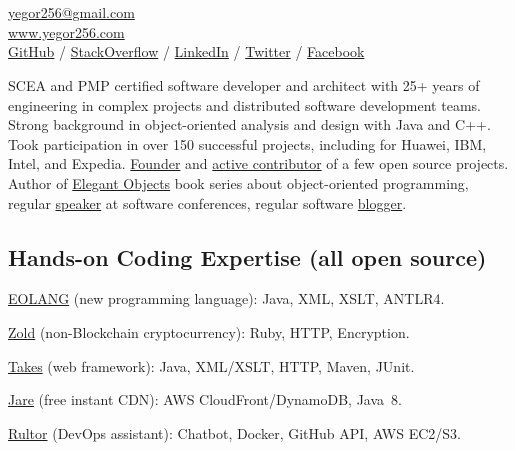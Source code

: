 \documentclass{yb}
\begin{document}
\ybPrintPhoto{}

\section*{\Large {}}

\href{mailto:yegor256@gmail.com}{yegor256@gmail.com}\\%
\href{https://www.yegor256.com}{www.yegor256.com}\\%
\href{https://github.com/yegor256}{GitHub} /
\href{https://stackexchange.com/users/63162/yegor256}{StackOverflow} /
\href{https://www.linkedin.com/in/yegor256}{LinkedIn} /
\href{https://twitter.com/intent/follow?screen_name=yegor256}{Twitter} /
\href{https://www.facebook.com/yegor256}{Facebook}

\vspace*{12pt}

SCEA and PMP certified software developer and architect with
25+ years of engineering in complex projects and distributed software
development teams. Strong background in object-oriented analysis and design
with Java and C++. Took participation in over 150 successful projects,
including for Huawei, IBM, Intel, and Expedia. \href{https://www.yegor256.com/pets.html}{Founder}
and \href{https://github.com/yegor256}{active contributor} of
a few open source projects. Author of
\href{https://www.yegor256.com/elegant-objects.html}{Elegant Objects}
book series about object-oriented programming,
regular \href{https://www.yegor256.com/talks.html}{speaker} at software conferences, regular software
\href{https://www.yegor256.com}{blogger}.

\subsection*{Hands-on Coding Expertise (all open source)}

\href{https://www.eolang.org}{EOLANG} (new programming language):
Java, XML, XSLT, ANTLR4.

\href{https://www.zold.io}{Zold} (non-Blockchain cryptocurrency):
Ruby, HTTP, Encryption.

\href{https://www.takes.org}{Takes} (web framework):
Java, XML/XSLT, HTTP, Maven, JUnit.

\href{https://www.jare.io}{Jare} (free instant CDN):
AWS CloudFront/DynamoDB, Java~8.

\href{https://www.rultor.com}{Rultor} (DevOps assistant):
Chatbot, Docker, GitHub API, AWS EC2/S3.
\end{document}
